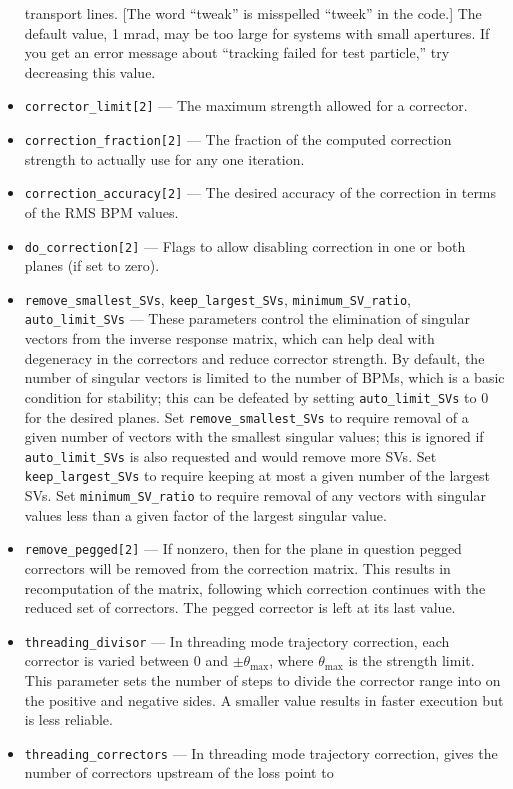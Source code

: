 \documentclass[11pt]{article}
\begin{document}
\begin{itemize}
transport lines.
[The word ``tweak'' is misspelled ``tweek'' in the code.]   The default value, 1 mrad, may be too large for systems with
small apertures.  If you get an error message about ``tracking failed for test particle,'' try decreasing this value.
\item \verb|corrector_limit[2]| --- The maximum strength allowed for a corrector.
\item \verb|correction_fraction[2]| --- The fraction of the computed correction strength to actually use for any one iteration.
\item \verb|correction_accuracy[2]| --- The desired accuracy of the correction in terms of the RMS BPM values.
\item \verb|do_correction[2]| --- Flags to allow disabling correction in one or both planes (if set to zero).
\item \verb|remove_smallest_SVs|, \verb|keep_largest_SVs|, \verb|minimum_SV_ratio|, \verb|auto_limit_SVs| --- These parameters control the elimination of
  singular vectors from the inverse response matrix, which can help deal with degeneracy in the correctors and reduce corrector strength.
  By default, the number of singular vectors is limited to the number of BPMs, which is a basic condition for stability; this can be defeated by
  setting \verb|auto_limit_SVs| to 0 for the desired planes.  Set \verb|remove_smallest_SVs| to require removal of a given number of
  vectors with the smallest singular values; this is ignored if \verb|auto_limit_SVs| is also requested and would remove more SVs. 
  Set \verb|keep_largest_SVs| to require keeping at most a given number of the largest SVs.
  Set \verb|minimum_SV_ratio| to require removal of any vectors with singular values less than a given factor of the largest singular value.
\item \verb|remove_pegged[2]| --- If nonzero, then for the plane in question pegged correctors will be removed from the correction matrix.
  This results in recomputation of the matrix, following which correction continues with the reduced set of correctors.
  The pegged corrector is left at its last value.
\item \verb|threading_divisor| --- In threading mode trajectory correction, each corrector is varied between 0 and $\pm{\theta_{\textrm{max}}}$, 
  where $\theta_{\textrm{max}}$ is the strength limit.
  This parameter sets the number of steps to divide the corrector range into on the positive and negative sides.
  A smaller value results in faster execution but is less reliable.
\item \verb|threading_correctors| --- In threading mode trajectory correction, gives the number of correctors upstream of the loss point to

\end{itemize}
\end{document}
